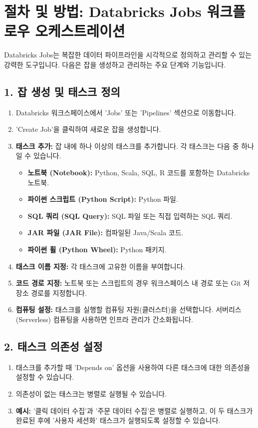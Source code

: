 \documentclass[11pt,a4paper]{article}
\begin{document}
\newpage
\section*{절차 및 방법: Databricks Jobs 워크플로우 오케스트레이션}

Databricks Jobs는 복잡한 데이터 파이프라인을 시각적으로 정의하고 관리할 수 있는 강력한 도구입니다. 다음은 잡을 생성하고 관리하는 주요 단계와 기능입니다.

\subsection*{1. 잡 생성 및 태스크 정의}
\begin{enumerate}
    \item Databricks 워크스페이스에서 'Jobs' 또는 'Pipelines' 섹션으로 이동합니다.
    \item 'Create Job'을 클릭하여 새로운 잡을 생성합니다.
    \item \textbf{태스크 추가:} 잡 내에 하나 이상의 태스크를 추가합니다. 각 태스크는 다음 중 하나일 수 있습니다.
    \begin{itemize}
        \item \textbf{노트북 (Notebook):} Python, Scala, SQL, R 코드를 포함하는 Databricks 노트북.
        \item \textbf{파이썬 스크립트 (Python Script):} Python 파일.
        \item \textbf{SQL 쿼리 (SQL Query):} SQL 파일 또는 직접 입력하는 SQL 쿼리.
        \item \textbf{JAR 파일 (JAR File):} 컴파일된 Java/Scala 코드.
        \item \textbf{파이썬 휠 (Python Wheel):} Python 패키지.
    \end{itemize}
    \item \textbf{태스크 이름 지정:} 각 태스크에 고유한 이름을 부여합니다.
    \item \textbf{코드 경로 지정:} 노트북 또는 스크립트의 경우 워크스페이스 내 경로 또는 Git 저장소 경로를 지정합니다.
    \item \textbf{컴퓨팅 설정:} 태스크를 실행할 컴퓨팅 자원(클러스터)을 선택합니다. 서버리스(Serverless) 컴퓨팅을 사용하면 인프라 관리가 간소화됩니다.
\end{enumerate}

\subsection*{2. 태스크 의존성 설정}
\begin{enumerate}
    \item 태스크를 추가할 때 'Depends on' 옵션을 사용하여 다른 태스크에 대한 의존성을 설정할 수 있습니다.
    \item 의존성이 없는 태스크는 병렬로 실행될 수 있습니다.
    \item \textbf{예시:} '클릭 데이터 수집'과 '주문 데이터 수집'은 병렬로 실행하고, 이 두 태스크가 완료된 후에 '사용자 세션화' 태스크가 실행되도록 설정할 수 있습니다.
\end{enumerate}
\end{document}
